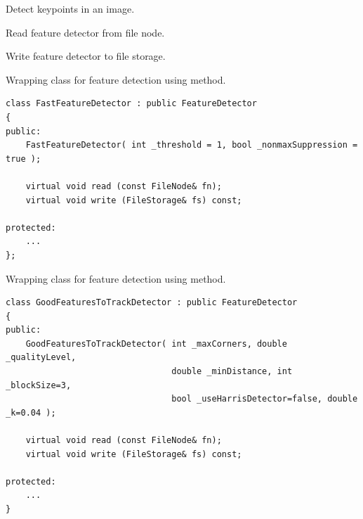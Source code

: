 Detect keypoints in an image.


\begin{description}
\end{description}

Read feature detector from file node.


\begin{description}
\end{description}

Write feature detector to file storage.


\begin{description}
\end{description}

Wrapping class for feature detection using  method.

\begin{lstlisting}
class FastFeatureDetector : public FeatureDetector
{
public:
    FastFeatureDetector( int _threshold = 1, bool _nonmaxSuppression = true );
    
	virtual void read (const FileNode& fn);
    virtual void write (FileStorage& fs) const;
    
protected:
	...
};
\end{lstlisting}

Wrapping class for feature detection using  method.

\begin{lstlisting}
class GoodFeaturesToTrackDetector : public FeatureDetector
{
public:
    GoodFeaturesToTrackDetector( int _maxCorners, double _qualityLevel, 
                                 double _minDistance, int _blockSize=3,
                                 bool _useHarrisDetector=false, double _k=0.04 );
                                 
    virtual void read (const FileNode& fn);
    virtual void write (FileStorage& fs) const;
    
protected:
	...
}
\end{lstlisting}

